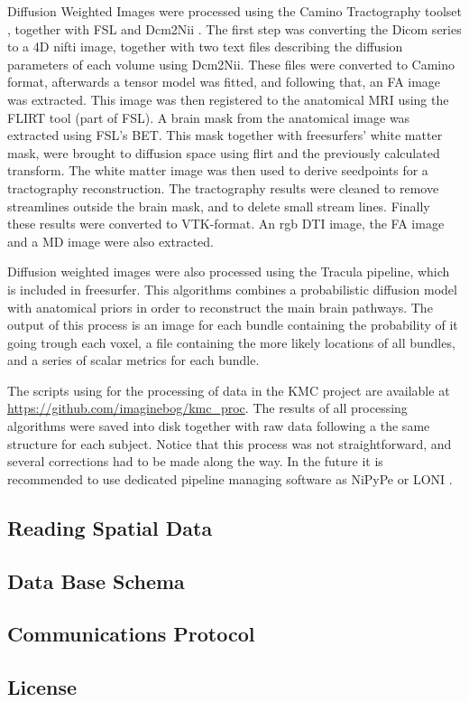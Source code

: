 Diffusion Weighted Images were processed using the Camino Tractography toolset \autocite{cook_camino:_2006}, together with FSL  and Dcm2Nii \autocite{rorden_mricron_2007}. The first step was converting the Dicom series to a 4D nifti image, together with two text files describing the diffusion parameters of each volume using Dcm2Nii. These files were converted to Camino format, afterwards a tensor model was fitted, and  following that, an FA image was extracted. This image was then registered to the anatomical MRI using the FLIRT tool (part of FSL). A brain mask from the anatomical image was extracted using FSL's BET. This mask together with freesurfers' white matter mask, were brought to diffusion space using flirt and the previously calculated transform. The white matter image was then used to derive seedpoints for a tractography reconstruction. The tractography results were cleaned to remove streamlines outside the brain mask, and to delete small stream lines. Finally these results were converted to VTK-format. An rgb DTI image, the FA image and a MD image were also extracted.  

Diffusion weighted images were also processed using the Tracula \autocite{yendiki_fully_2009} pipeline, which is included in freesurfer. This algorithms combines a probabilistic diffusion model with anatomical priors in order to reconstruct the main brain pathways. The output of this process is an image for each bundle containing the probability of it going trough each voxel, a file containing the more likely locations of all bundles, and a series of scalar metrics for each bundle.

The scripts using for the processing of data in the KMC project are available at \url{https://github.com/imaginebog/kmc_proc}. The results of all processing algorithms were saved into disk together with raw data following a the same structure for each subject. Notice that this process was not straightforward, and several corrections had to be made along the way. In the future it is recommended to use dedicated pipeline managing software as NiPyPe \autocite{gorgolewski_nipype:_2011} or LONI \autocite{dinov_efficient_2009}.

\subsection{Reading Spatial Data}





\subsection{Data Base Schema}

\subsection{Communications Protocol}

\subsection{License}
